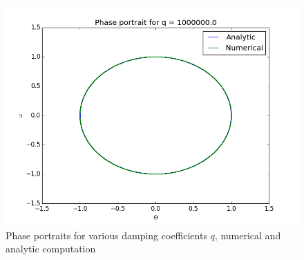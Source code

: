 \documentclass[12pt]{article}
\begin{document}
\begin{figure}[]
\begin{minipage}[t]{0.45\textwidth}
\end{minipage}
\begin{minipage}[t]{0.45\textwidth}
\includegraphics[width=\textwidth]{both10000000.png}
\end{minipage}
\caption{Phase portraits for various damping coefficients $q$, numerical and analytic computation}
\label{fig:2}   
\end{figure}
\end{document}

